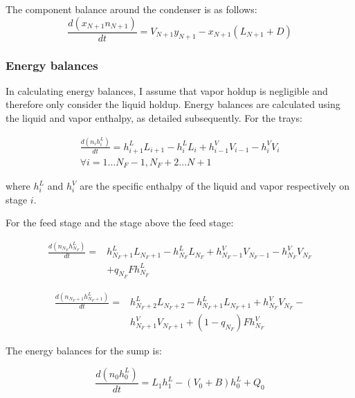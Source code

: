 The component balance around the condenser is as follows:
\begin{equation}
    \frac{d(x_{N+1} n_{N+1})}{dt}  = V_{N+1} y_{N+1} - x_{N+1} (L_{N+1} + D)
\end{equation}

\subsubsection{Energy balances}\label{sec:energy_balances}

In calculating energy balances, I assume that vapor holdup is negligible and therefore only consider the liquid holdup. Energy balances are calculated using the liquid and vapor enthalpy, as detailed subsequently. For the trays:

\begin{equation}
\begin{split}
    \frac{d(n_ih^L_i)}{dt} = h^L_{i+1}L_{i+1}-h^L_iL_i+h^V_{i-1}V_{i-1}-h^V_iV_i \\ \forall i=1 \dots N_F-1, N_F+2 \dots N+1
\end{split}
\end{equation}

where $h^L_i$ and $h^V_i$ are the specific enthalpy of the liquid and vapor respectively on stage $i$.

For the feed stage and the stage above the feed stage:

\begin{equation}
\begin{split}
    \frac{d(n_{N_F}h^L_{N_F})}{dt} = & h^L_{N_F+1}L_{N_F+1}-h^L_{N_F}L_{N_F} + h^V_{N_F-1}V_{N_F-1}-h^V_{N_F}V_{N_F} \\ &  + q_{N_F}F h^L_{N_F}
\end{split}
\end{equation}


\begin{equation}
\begin{split}
    \frac{d(n_{N_F+1}h^L_{N_F+1})}{dt} = & h^L_{N_F+2}L_{N_F+2}-h^L_{N_F+1}L_{N_F+1} +h^V_{N_F} V_{N_F}-\\ &h^V_{N_F+1} V_{N_F+1} + (1-q_{N_F})Fh^V_{N_F}
\end{split}
\end{equation}

 The energy balances for the sump is:

\begin{equation}
    \frac{d(n_0h^L_0)}{dt} = L_1 h^L_1 - (V_0 + B) h^L_0 + Q_0
\end{equation}

